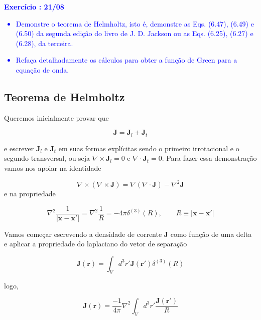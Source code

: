\textcolor{blue}{
	\textbf{Exercício \paragraphnum: 21/08 }
	\begin{itemize}
		\item Demonstre o teorema de Helmholtz, isto é, demonstre as Eqs. (6.47), (6.49) e (6.50) da segunda edição do livro de J. D. Jackson ou as Eqs. (6.25), (6.27) e (6.28), da terceira.
		\item Refaça detalhadamente os cálculos para obter a função de Green para a equação de onda.
	\end{itemize}
}


\subsection*{Teorema de Helmholtz}

Queremos inicialmente provar que 

\begin{equation}
	\textbf{J} = \textbf{J}_l + \textbf{J}_t
\end{equation}

e escrever $\textbf{J}_l$ e $\textbf{J}_t$ em suas formas explícitas sendo o primeiro irrotacional e o segundo transversal, ou seja  $\nabla \times \textbf{J}_l = 0$ e $\nabla \cdot \textbf{J}_t = 0$. Para fazer essa demonstração vamos nos apoiar na identidade

\begin{equation}
	\nabla \times \left( \nabla \times \textbf{J}\right) = \nabla \left( \nabla \cdot \textbf{J}\right) - \nabla^2\textbf{J}
	\label{eq2:identidade}
\end{equation}
e na propriedade

\begin{equation}
	\nabla^2\frac{1}{|\textbf{x}-\textbf{x}'|} = \nabla^2\frac{1}{R}= -4\pi\delta^{(3)}(R), \qquad R \equiv |\textbf{x}-\textbf{x}'|
\end{equation}

Vamos começar escrevendo a densidade de corrente \textbf{J} como função de uma delta e aplicar a propriedade do laplaciano do vetor de separação

\begin{equation}
	\textbf{J}(\textbf{r}) = \int_V d^3r' \textbf{J}(\textbf{r}')\delta^{(3)}(R)
\end{equation}

logo,

\begin{equation}
	\textbf{J}(\textbf{r}) = \frac{-1}{4\pi} \nabla^2\int_V d^3r' \frac{\textbf{J}(\textbf{r}')}{R}
\end{equation}

